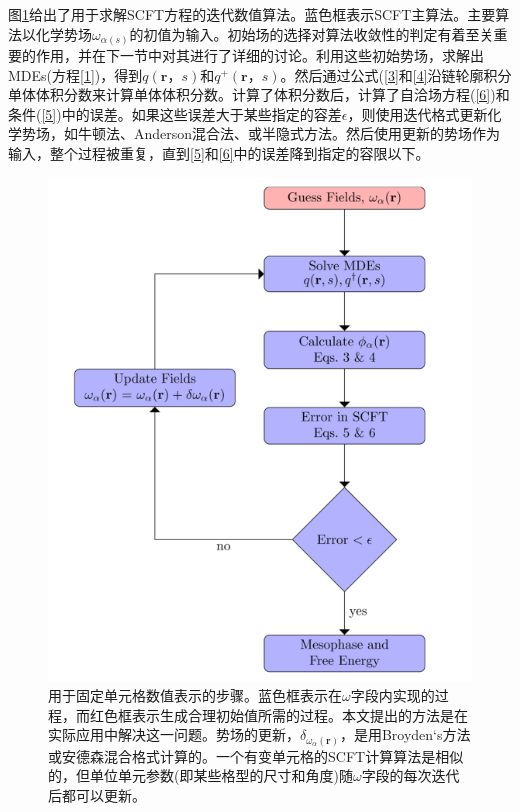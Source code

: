 \documentclass[12pt，a4paper]{article}
\numberwithin{equation}{section}
\begin{document}
图\ref{图1}给出了用于求解SCFT方程的迭代数值算法。蓝色框表示SCFT主算法。主要算法以化学势场$\omega_{\alpha (s)}$的初值为输入。初始场的选择对算法收敛性的判定有着至关重要的作用，并在下一节中对其进行了详细的讨论。利用这些初始势场，求解出MDEs(方程\ref{1})，得到$q(\mathbf{r}，s)$和$q^{+}(\mathbf{r}，s)$。然后通过公式(\ref{3}和\ref{4}沿链轮廓积分单体体积分数来计算单体体积分数。计算了体积分数后，计算了自洽场方程(\ref{6})和条件(\ref{5})中的误差。如果这些误差大于某些指定的容差$\epsilon$，则使用迭代格式更新化学势场，如牛顿法、Anderson混合法、或半隐式方法。然后使用更新的势场作为输入，整个过程被重复，直到\ref{5}和\ref{6}中的误差降到指定的容限以下。
\begin{figure}[H]
\centering
\includegraphics[scale=0.5]{./figures/1.png}
\caption{用于固定单元格数值表示的步骤。蓝色框表示在$\omega$字段内实现的过程，而红色框表示生成合理初始值所需的过程。本文提出的方法是在实际应用中解决这一问题。势场的更新，$\delta _{\omega_{\alpha}(\mathbf{r})}$，是用Broyden‘s方法或安德森混合格式计算的。一个有变单元格的SCFT计算算法是相似的，但单位单元参数(即某些格型的尺寸和角度)随$\omega$字段的每次迭代后都可以更新。}
\label{图1}
\end{figure}
\end{document}
